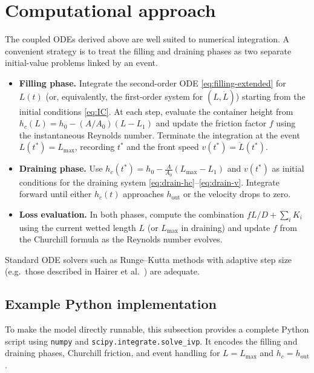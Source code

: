 \documentclass[11pt]{article}
\begin{document}
\section{Computational approach}
\label{sec:comp}
The coupled ODEs derived above are well suited to numerical integration. A convenient
strategy is to treat the filling and draining phases as two separate initial-value problems
linked by an event.
\begin{itemize}
  \item \textbf{Filling phase.} Integrate the second-order ODE \eqref{eq:filling-extended}
        for $L(t)$ (or, equivalently, the first-order system for $(L,\dot L)$) starting from
        the initial conditions \eqref{eq:IC}. At each step, evaluate the container height from
        $h_c(L)=h_0-(A/A_0)(L-L_1)$ and update the friction factor $f$ using the instantaneous
        Reynolds number. Terminate the integration at the event $L(t^*)=L_{\max}$, recording
        $t^*$ and the front speed $v(t^*)=\dot L(t^*)$.
  \item \textbf{Draining phase.} Use $h_c(t^*) = h_0 - \tfrac{A}{A_0}(L_{\max}-L_1)$ and
        $v(t^*)$ as initial conditions for the draining system \eqref{eq:drain-hc}--\eqref{eq:drain-v}.
        Integrate forward until either $h_c(t)$ approaches $h_{\text{out}}$ or the velocity
        drops to zero.
  \item \textbf{Loss evaluation.} In both phases, compute the combination
        $fL/D+\sum_i K_i$ using the current wetted length $L$ (or $L_{\max}$ in draining)
        and update $f$ from the Churchill formula as the Reynolds number evolves.
\end{itemize}
Standard ODE solvers such as Runge--Kutta methods with adaptive step size (e.g.\ those
described in Hairer et al.~\cite{hairer}) are adequate.

\subsection*{Example Python implementation}

To make the model directly runnable, this subsection provides a complete Python script
using \texttt{numpy} and \texttt{scipy.integrate.solve_ivp}. It encodes the filling and
draining phases, Churchill friction, and event handling for $L=L_{\max}$ and $h_c=h_{\text{out}}$.
\end{document}
